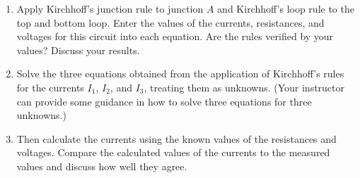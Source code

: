 \begin{multicols}{2}
\begin{enumerate}
	\item Apply Kirchhoff's junction rule to junction $A$ and Kirchhoff's loop rule to the top and bottom loop.  Enter the values of the currents, resistances, and voltages for this circuit into each equation.  Are the rules verified by your values? Discuss your results.
	\item Solve the three equations obtained from the application of Kirchhoff's rules for the currents $I_1$, $I_2$, and $I_3$, treating them as unknowns. (Your instructor can provide some guidance in how to solve three equations for three unknowns.)
	\item Then calculate the currents using the known values of the resistances and voltages.  Compare the calculated values of the currents to the measured values and discuss how well they agree. 
\end{enumerate}

%
\end{multicols}


